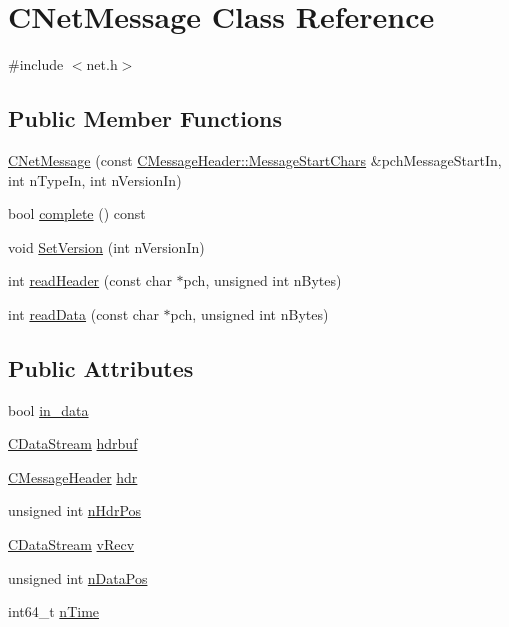 \hypertarget{class_c_net_message}{}\section{C\+Net\+Message Class Reference}
\label{class_c_net_message}


{\ttfamily \#include $<$net.\+h$>$}

\subsection*{Public Member Functions}
\begin{DoxyCompactItemize}
\item 
\hyperlink{class_c_net_message_a19f23086d183f2f62d0371960b48c105}{C\+Net\+Message} (const \hyperlink{class_c_message_header_a0d0eeb540cbf4087973f6652ad61878f}{C\+Message\+Header\+::\+Message\+Start\+Chars} \&pch\+Message\+Start\+In, int n\+Type\+In, int n\+Version\+In)
\item 
bool \hyperlink{class_c_net_message_a440150fa0e6a84699780048baca55da8}{complete} () const 
\item 
void \hyperlink{class_c_net_message_a63b9f2351d5e92126cacacd51d9e16b6}{Set\+Version} (int n\+Version\+In)
\item 
int \hyperlink{class_c_net_message_a3e58f5f29b23d1377f8fd15fc75c78ac}{read\+Header} (const char $\ast$pch, unsigned int n\+Bytes)
\item 
int \hyperlink{class_c_net_message_adbc1669a56462daea5f37e5e99117f8c}{read\+Data} (const char $\ast$pch, unsigned int n\+Bytes)
\end{DoxyCompactItemize}
\subsection*{Public Attributes}
\begin{DoxyCompactItemize}
\item 
bool \hyperlink{class_c_net_message_a8f399ad7225f980bdab3ede17b1b23af}{in\+\_\+data}
\item 
\hyperlink{class_c_data_stream}{C\+Data\+Stream} \hyperlink{class_c_net_message_a80a6f95f0c187aa97788118248cbf452}{hdrbuf}
\item 
\hyperlink{class_c_message_header}{C\+Message\+Header} \hyperlink{class_c_net_message_ae7215dca62862a3688f7eeb94646c377}{hdr}
\item 
unsigned int \hyperlink{class_c_net_message_a1a500121037490eec4b238906f3a23ad}{n\+Hdr\+Pos}
\item 
\hyperlink{class_c_data_stream}{C\+Data\+Stream} \hyperlink{class_c_net_message_a1a25c16099d01362e1663390a2e06d1a}{v\+Recv}
\item 
unsigned int \hyperlink{class_c_net_message_a418f59287d1805dda6959f27a170c855}{n\+Data\+Pos}
\item 
int64\+\_\+t \hyperlink{class_c_net_message_a99d5bbca862ac4b7a88b71a7b679decc}{n\+Time}
\end{DoxyCompactItemize}


